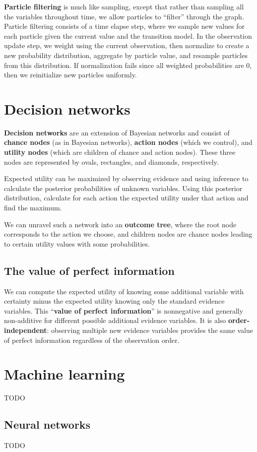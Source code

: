 \documentclass[12pt]{article}
\begin{document}
\textbf{Particle filtering} is much like sampling, except that rather than sampling all the variables throughout time, we allow particles to ``filter'' through the graph. Particle filtering consists of a time elapse step, where we sample new values for each particle given the current value and the transition model. In the observation update step, we weight using the current observation, then normalize to create a new probability distribution, aggregate by particle value, and resample particles from this distribution. If normalization fails since all weighted probabilities are $0$, then we reinitialize new particles uniformly.

\section{Decision networks}

\textbf{Decision networks} are an extension of Bayesian networks and consist of \textbf{chance nodes} (as in Bayesian networks), \textbf{action nodes} (which we control), and \textbf{utility nodes} (which are children of chance and action nodes). These three nodes are represented by ovals, rectangles, and diamonds, respectively.

Expected utility can be maximized by observing evidence and using inference to calculate the posterior probabilities of unknown variables. Using this posterior distribution, calculate for each action the expected utility under that action and find the maximum.

We can unravel such a network into an \textbf{outcome tree}, where the root node corresponds to the action we choose, and children nodes are chance nodes leading to certain utility values with some probabilities.

\subsection{The value of perfect information}

We can compute the expected utility of knowing some additional variable with certainty minus the expected utility knowing only the standard evidence variables. This ``\textbf{value of perfect information}'' is nonnegative and generally non-additive for different possible additional evidence variables. It is also \textbf{order-independent}: observing multiple new evidence variables provides the same value of perfect information regardless of the observation order.

\section{Machine learning}

TODO

\subsection{Neural networks}

TODO
\end{document}
